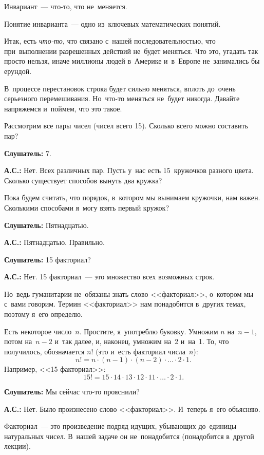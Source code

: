 Инвариант~--- что-то, что не~меняется.

Понятие инварианта~--- одно из~ключевых математических понятий.

Итак, есть \textit{что-то}, что связано с~нашей последовательностью, что при~выполнении разрешенных действий
не~будет меняться. Что это, угадать так просто нельзя, иначе миллионы людей в~Америке и~в~Европе
не~занимались бы ерундой.

В~процессе перестановок строка будет сильно меняться, вплоть до~очень серьезного перемешивания.
Но~что-то меняться не~будет никогда. Давайте напряжемся и~поймем, что это такое.

Рассмотрим все пары чисел (чисел всего 15). Сколько всего можно составить пар?

\textbf{Слушатель:} 7.

\textbf{А.С.:} Нет. Всех различных пар. Пусть у~нас есть 15~кружочков разного цвета. Сколько
существует способов вынуть два кружка?


Пока будем считать, что порядок, в~котором мы вынимаем кружочки, нам важен. Сколькими способами я~могу взять первый кружок?

\textbf{Слушатель:} Пятнадцатью.

\textbf{А.С.:} Пятнадцатью. Правильно.

\textbf{Слушатель:} 15 факториал?

\textbf{А.С.:} Нет. 15 факториал~--- это множество всех возможных строк.


Но~ведь гуманитарии не~обязаны знать слово <<факториал>>, о~котором мы с~вами говорим. Термин <<факториал>>
нам понадобится в~других темах, поэтому я~его определю.

Есть некоторое число~$n$. Простите, я~употреблю буковку. Умножим $n$ на~$n-1$, потом на~$n-2$ и~так далее, и, наконец, умножим на~2 и~на~1.
То, что получилось, обозначается $n!$ (это и~есть факториал числа~$n$):
$$
n!=n\cdot (n-1)\cdot (n-2)\cdot \ldots\cdot 2\cdot 1.
$$
Например, <<15 факториал>>:
$$
15!=15\cdot 14\cdot 13\cdot 12\cdot 11\cdot \ldots\cdot 2\cdot 1.
$$

\textbf{Слушатель:} Мы сейчас что-то прояснили?

\textbf{А.С.:} Нет. Было произнесено слово <<факториал>>. И~теперь я~его объясняю.

Факториал~--- это произведение подряд идущих, убывающих до~единицы натуральных чисел. В~нашей
задаче он не~понадобится (понадобится в~другой лекции).

